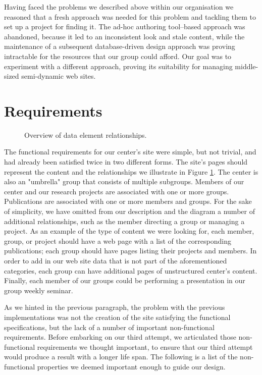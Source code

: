 \documentclass[10pt]{article}
\begin{document}
Having faced the problems we described above within our organisation we reasoned that
a fresh approach was needed for this problem and tackling them to 
set up a project for finding it.
The ad-hoc authoring tool--based approach was abandoned,
because it led to an inconsistent look and stale content,
while the maintenance of a subsequent database-driven
design approach was proving intractable for the resources that
our group could afford.
Our goal was to experiment with a different approach,
proving its suitability for managing middle-sized semi-dynamic
web sites.

\section{Requirements}
\label{sec:req}

\begin{figure}
\begin{center}
\leavevmode
{}
\end{center}
\caption{
\label{fig:diag}
Overview of data element relationships.}
\end{figure}

The functional requirements for our center's site were
simple, but not trivial, and had already been satisfied
twice in two different forms.
The site's pages should represent the content and the relationships
we illustrate in Figure \ref{fig:diag}.
The center is also an "umbrella" group that consists of multiple subgroups.
Members of our center and our research projects are associated
with one or more groups.
Publications are associated
with one or more members and groups.
For the sake of simplicity,
we have omitted from our description and the diagram
a number of additional relationships,
such as the member directing a group or managing a project.
As an example of the type of content we were looking for, 
each member, group, or project should have a web page with a list
of the corresponding publications;
each group should have pages listing their projects and members. 
In order to add in our web site data that is not part of the aforementioned categories,
each group can have additional pages of unstructured center's content.
Finally, each member of our groups could be performing a presentation in our group weekly seminar.

As we hinted in the previous paragraph, the problem with
the previous implementations was not the creation of the site
satisfying the functional specifications,
but the lack of a number of important non-functional requirements.
Before embarking on our third attempt,
we articulated those non-functional requirements
we thought important, to ensure that our third attempt would produce
a result with a longer life span.
The following is a list of the non-functional properties
we deemed important enough to guide our design.
\end{document}
